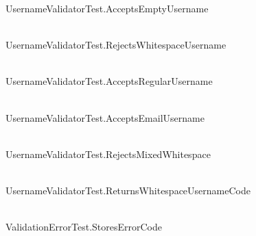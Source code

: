 \begin{DoxyRefList}
\label{test__test000021}%
%
Username\+Validator\+Test.\+Accepts\+Empty\+Username  
\item[{\parbox[t]{\linewidth}{Member \doxylink{_username_validator_test_8cpp_a68e3651dc325eb9e7c22e09ba98254dc}{TEST} (Username\+Validator\+Test, Rejects\+Whitespace\+Username)}}]\hfill \\
\label{test__test000022}%
%
Username\+Validator\+Test.\+Rejects\+Whitespace\+Username  
\item[{\parbox[t]{\linewidth}{Member \doxylink{_username_validator_test_8cpp_a0a6e95ef9a6841babf1a64f0dd3323c0}{TEST} (Username\+Validator\+Test, Accepts\+Regular\+Username)}}]\hfill \\
\label{test__test000023}%
%
Username\+Validator\+Test.\+Accepts\+Regular\+Username  
\item[{\parbox[t]{\linewidth}{Member \doxylink{_username_validator_test_8cpp_abc0f165d67e52c2909d24fb81870e949}{TEST} (Username\+Validator\+Test, Accepts\+Email\+Username)}}]\hfill \\
\label{test__test000024}%
%
Username\+Validator\+Test.\+Accepts\+Email\+Username  
\item[{\parbox[t]{\linewidth}{Member \doxylink{_username_validator_test_8cpp_a5d8f1847eb205b3bf2b66f06485cb572}{TEST} (Username\+Validator\+Test, Rejects\+Mixed\+Whitespace)}}]\hfill \\
\label{test__test000025}%
%
Username\+Validator\+Test.\+Rejects\+Mixed\+Whitespace  
\item[{\parbox[t]{\linewidth}{Member \doxylink{_username_validator_test_8cpp_ac4683a423a8d8f28872df2d3eb87a1ea}{TEST} (Username\+Validator\+Test, Returns\+Whitespace\+Username\+Code)}}]\hfill \\
\label{test__test000026}%
%
Username\+Validator\+Test.\+Returns\+Whitespace\+Username\+Code  
\item[{\parbox[t]{\linewidth}{Member \doxylink{_validation_error_test_8cpp_a36f91cf067ed11828ec318578114f1ca}{TEST} (Validation\+Error\+Test, Stores\+Error\+Code)}}]\hfill \\
\label{test__test000027}%
%
Validation\+Error\+Test.\+Stores\+Error\+Code  
\item[{\parbox[t]{\linewidth}{Member \doxylink{_validation_error_test_8cpp_af1538bb72723c2694d7f3f0706b7551d}{TEST} (Title\+Validator\+Test, Empty\+Title\+Has\+Error\+Code)}}]\hfill \\

\end{DoxyRefList}
